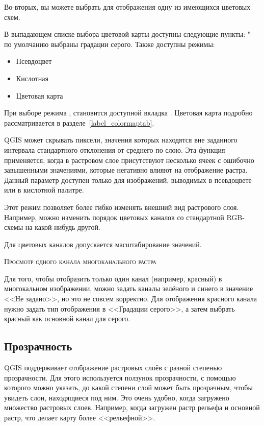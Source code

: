 Во-вторых, вы можете выбрать для отображения одну из имеющихся цветовых схем.

В выпадающем списке выбора цветовой карты доступны следующие пункты:
 "--- по умолчанию выбраны
градации серого. Также доступны режимы:
\begin{itemize}[label=--]
\item Псевдоцвет
\item Кислотная
\item Цветовая карта
\end{itemize}

При выборе режима , становится
доступной вкладка . Цветовая карта подробно
рассматривается в разделе~\ref{label_colormaptab}.

QGIS может скрывать пиксели, значения которых находятся вне заданного
интервала стандартного отклонения от среднего по слою.
Эта функция применяется, когда в растровом слое присутствуют несколько ячеек
с ошибочно завышенными значениями, которые негативно влияют на отображение растра.
Данный параметр доступен только для изображений, выводимых в псевдоцвете
или в кислотной палитре.


Этот режим позволяет более гибко изменять внешний вид растрового слоя.
Например, можно изменить порядок цветовых каналов со стандартной RGB-схемы на
какой-нибудь другой.

Для цветовых каналов допускается масштабирование значений.

\begin{Tip}\caption{\textsc{Просмотр одного канала многоканального растра}}
Для того, чтобы отобразить только один канал (например, красный) в
многокальном изображении, можно задать каналы зелёного и синего в значение
<<Не задано>>, но это не совсем корректно. Для отображения красного
канала нужно задать тип отображения в <<Градации серого>>, а затем
выбрать красный как основной канал для серого.
\end{Tip}

\subsection{Прозрачность} \label{rastertab:transparency}

QGIS поддерживает отображение растровых слоёв с разной степенью
прозрачности. Для этого используется
ползунок прозрачности, с помощью которого можно указать, до какой
степени слой может быть прозрачным, чтобы увидеть слои, находящиеся под
ним. Это очень удобно, когда загружено множество растровых слоев.
Например, когда загружен растр рельефа и основной растр, что делает
карту более <<рельефной>>.

